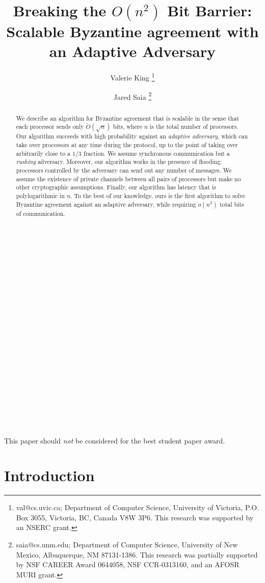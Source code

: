 \documentclass[letterpaper,11pt]{article}
\title{Breaking the $O(n^2)$ Bit Barrier: Scalable Byzantine agreement with an Adaptive Adversary}
\author{Valerie King \thanks{val@cs.uvic.ca; Department of Computer Science, University of Victoria, P.O.
Box 3055, Victoria, BC, Canada V8W 3P6.  This research was supported by an NSERC grant.} \and Jared Saia \thanks{saia@cs.unm.edu; Department of Computer Science, University of New Mexico, Albuquerque, NM 87131-1386. This research was partially supported by NSF CAREER Award 0644058, NSF CCR-0313160, and an AFOSR MURI grant.}}
\date{}
\begin{document}
\maketitle

\thispagestyle{empty}


\begin{abstract}

We describe an algorithm for Byzantine agreement that is scalable in the sense that each processor sends only $\tilde{O}(\sqrt{n})$ bits, where $n$ is the total number of processors.  Our algorithm succeeds with high probability against an \emph{adaptive adversary}, which can take over processors at any time during the protocol, up to the point of taking over arbitrarily close to a $1/3$ fraction.  We assume synchronous communication but a \emph{rushing} adversary.  Moreover, our algorithm works in the presence of flooding: processors controlled by the adversary can send out any number of messages.  We assume the existence of private channels between all pairs of processors but make no other cryptographic assumptions.  Finally, our algorithm has latency that is polylogarithmic in $n$.  To the best of our knowledge, ours is the first algorithm to solve Byzantine agreement against an adaptive adversary, while requiring $o(n^{2})$ total bits of communication.
\end{abstract}


\ \\ \ \\ \ \\ \ \\ \ \\ \ \\ \ \\ \ \\ \ \\ \ \\ \ \\ \ \\ \ \\ \ \\ \ \\ \ \\ \ \\ \ \\ \ \\

This paper should \emph{not} be considered for the best student paper award.


\pagebreak
\setcounter{page}{1}

\section{Introduction}
\end{document}
